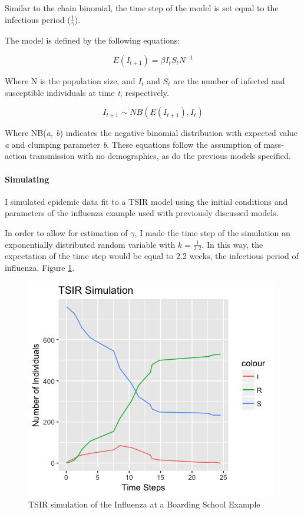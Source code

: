 \documentclass{article}
\begin{document}
Similar to the chain binomial, the time step of the model is set equal to the infectious period ($\frac{1}{\gamma}$). 

The model is defined by the following equations:

\begin{equation}
E(I_{t+1}) = \beta I_{t} S_{t} N^{-1}
\end{equation} 

Where N is the population size, and $I_{t}$ and $S_{t}$ are the number of infected and susceptible individuals at time {\itshape t}, respectively. 

\begin{equation}
I_{t+1} \sim NB(E(I_{t+1}), I_{t})
\end{equation} 

Where NB({\itshape a, b}) indicates the negative binomial distribution with expected value {\itshape a} and clumping parameter {\itshape b}. 
These equations follow the assumption of mass-action transmission with no demographics, as do the previous models specified. 

\paragraph{Simulating}

I simulated epidemic data fit to a TSIR model using the initial conditions and parameters of the influenza example used with previously discussed models. 

In order to allow for estimation of $\gamma$, I made the time step of the simulation an exponentially distributed random variable with $k = \frac{1}{2.2}$. In this way, the expectation of the time step would be equal to 2.2 weeks, the infectious period of influenza. Figure \ref{fig:TSIRsim}. 

\begin{figure}[htbp]
\includegraphics[scale=.5, center]{TSIRSIm.png}
\caption{TSIR simulation of the Influenza at a Boarding School Example}
\label{fig:TSIRsim}
\end{figure}
\end{document}
